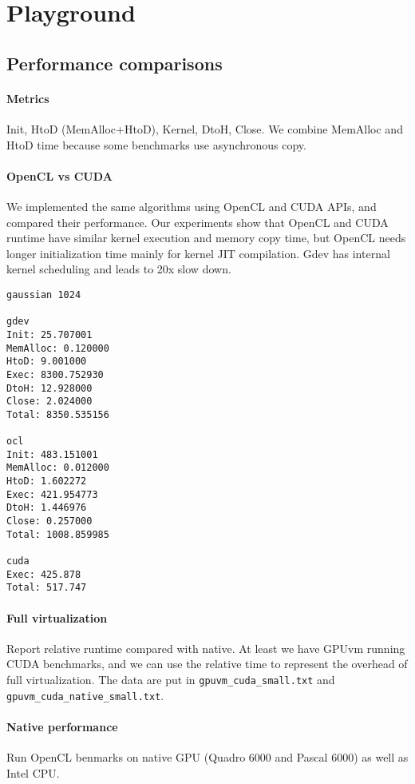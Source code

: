 \section{Playground}
\label{sec_playground}

\subsection{Performance comparisons}

\paragraph{Metrics} Init, HtoD (MemAlloc+HtoD), Kernel, DtoH, Close. We
combine MemAlloc and HtoD time because some benchmarks use asynchronous
copy.

\paragraph{OpenCL vs CUDA} We implemented the same algorithms using
OpenCL and CUDA APIs, and compared their performance. Our experiments
show that OpenCL and CUDA runtime have similar kernel execution and
memory copy time, but OpenCL needs longer initialization time mainly for
kernel JIT compilation. Gdev has internal kernel scheduling and leads to
20x slow down.

\begin{verbatim}
gaussian 1024

gdev
Init: 25.707001
MemAlloc: 0.120000
HtoD: 9.001000
Exec: 8300.752930
DtoH: 12.928000
Close: 2.024000
Total: 8350.535156

ocl
Init: 483.151001
MemAlloc: 0.012000
HtoD: 1.602272
Exec: 421.954773
DtoH: 1.446976
Close: 0.257000
Total: 1008.859985

cuda
Exec: 425.878
Total: 517.747
\end{verbatim}

\paragraph{Full virtualization} Report relative runtime compared with
native. At least we have GPUvm running CUDA benchmarks, and we can use
the relative time to represent the overhead of full virtualization. The
data are put in \texttt{gpuvm\_cuda\_small.txt} and
\texttt{gpuvm\_cuda\_native\_small.txt}.

\paragraph{Native performance} Run OpenCL benmarks on native GPU (Quadro
6000 and Pascal 6000) as well as Intel CPU.
